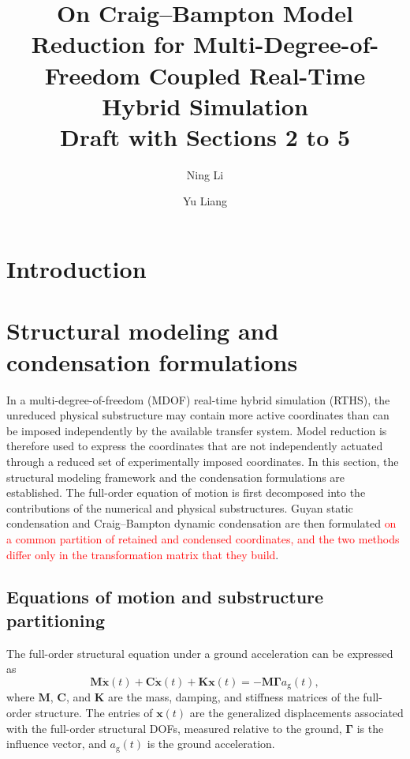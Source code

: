 \documentclass[11pt,a4paper]{article}
\title{On Craig--Bampton Model Reduction for Multi-Degree-of-Freedom Coupled Real-Time Hybrid Simulation\\[4pt]
\large Draft with Sections 2 to 5}
\author{Ning Li \and Yu Liang}
\date{}
\numberwithin{equation}{section}
\newcommand{\rev}[1]{\textcolor{red}{#1}}
\begin{document}
\maketitle

\begin{abstract}
	
\end{abstract}

\section{Introduction} \label{sec1}



\section{Structural modeling and condensation formulations} \label{sec2}

In a multi-degree-of-freedom (MDOF) real-time hybrid simulation (RTHS), the unreduced physical substructure may contain more active coordinates than can be imposed independently by the available transfer system. Model reduction is therefore used to express the coordinates that are not independently actuated through a reduced set of experimentally imposed coordinates.
In this section, the structural modeling framework and the condensation formulations are established. The full-order equation of motion is first decomposed into the contributions of the numerical and physical substructures. Guyan static condensation and Craig--Bampton dynamic condensation are then formulated \rev{on a common partition of retained and condensed coordinates, and the two methods differ only in the transformation matrix that they build}.

\subsection{Equations of motion and substructure partitioning}
The full-order structural equation under a ground acceleration can be expressed as
\begin{equation}
	\mathbf{M}\ddot{\bm{x}}(t)+\mathbf{C}\dot{\bm{x}}(t)+\mathbf{K}\bm{x}(t)
	=-\mathbf{M}\bm{\Gamma}a_{\mathrm{g}}(t),
	\label{eq:full-order-eom}
\end{equation}
where \(\mathbf{M}\), \(\mathbf{C}\), and \(\mathbf{K}\) are the mass, damping, and stiffness matrices of the full-order structure. The entries of \(\bm{x}(t)\) are the generalized displacements associated with the full-order structural DOFs, measured relative to the ground, \(\bm{\Gamma}\) is the influence vector, and \(a_{\mathrm{g}}(t)\) is the ground acceleration.
\end{document}
